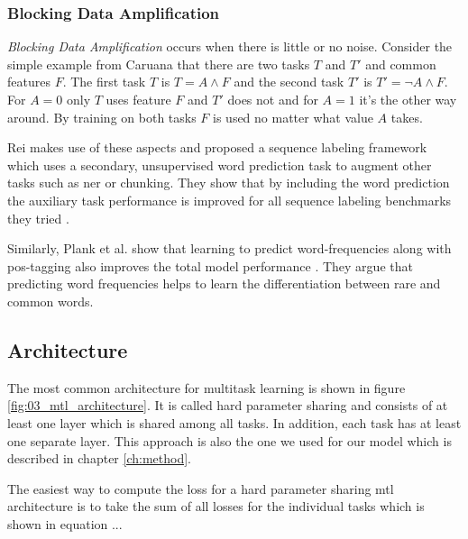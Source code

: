 \subsubsection*{Blocking Data Amplification}

\textit{Blocking Data Amplification} occurs when there is little or no noise. Consider the simple example from Caruana \cite{Caruana1995a} that there are two tasks $T$ and $T'$ and common features $F$. The first task $T$ is $T = A \land F $ and the second task $T'$ is $T' = \neg A \land F$. For $A=0$ only $T$ uses feature $F$ and $T'$ does not and for $A=1$ it's the other way around. By training on both tasks $F$ is used no matter what value $A$ takes. 

Rei makes use of these aspects and proposed a sequence labeling framework which uses a secondary, unsupervised word prediction task to augment other tasks such as \gls{ner} or chunking. They show that by including the word prediction the auxiliary task performance is improved for all sequence labeling benchmarks they tried \cite{Rei2017}.

Similarly, Plank et al. show that learning to predict word-frequencies along with \gls{pos}-tagging also improves the total model performance \cite{Plank}. They argue that predicting word frequencies helps to learn the differentiation between rare and common words.


\subsection{Architecture}
The most common architecture for multitask learning is shown in figure \ref{fig:03_mtl_architecture}. It is called hard parameter sharing and consists of at least one layer which is shared among all tasks. In addition, each task has at least one separate layer. This approach is also the one we used for our model which is described in chapter \ref{ch:method}. 

The easiest way to compute the loss for a hard parameter sharing \gls{mtl} architecture is to take the sum of all losses for the individual tasks which is shown in equation ...


